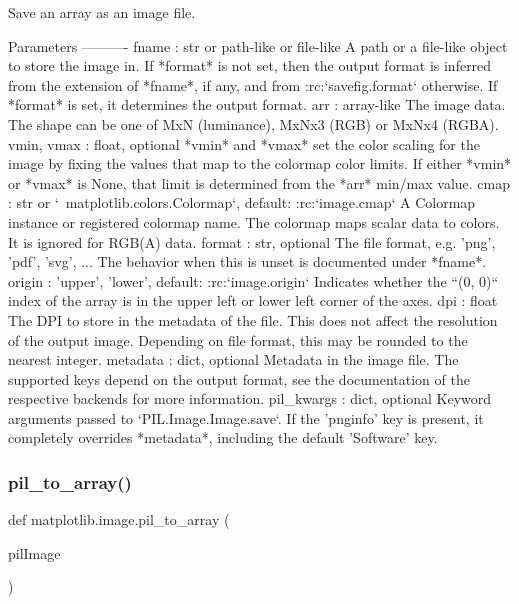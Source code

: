 \begin{DoxyVerb}Save an array as an image file.

Parameters
----------
fname : str or path-like or file-like
    A path or a file-like object to store the image in.
    If *format* is not set, then the output format is inferred from the
    extension of *fname*, if any, and from :rc:`savefig.format` otherwise.
    If *format* is set, it determines the output format.
arr : array-like
    The image data. The shape can be one of
    MxN (luminance), MxNx3 (RGB) or MxNx4 (RGBA).
vmin, vmax : float, optional
    *vmin* and *vmax* set the color scaling for the image by fixing the
    values that map to the colormap color limits. If either *vmin*
    or *vmax* is None, that limit is determined from the *arr*
    min/max value.
cmap : str or `~matplotlib.colors.Colormap`, default: :rc:`image.cmap`
    A Colormap instance or registered colormap name. The colormap
    maps scalar data to colors. It is ignored for RGB(A) data.
format : str, optional
    The file format, e.g. 'png', 'pdf', 'svg', ...  The behavior when this
    is unset is documented under *fname*.
origin : {'upper', 'lower'}, default: :rc:`image.origin`
    Indicates whether the ``(0, 0)`` index of the array is in the upper
    left or lower left corner of the axes.
dpi : float
    The DPI to store in the metadata of the file.  This does not affect the
    resolution of the output image.  Depending on file format, this may be
    rounded to the nearest integer.
metadata : dict, optional
    Metadata in the image file.  The supported keys depend on the output
    format, see the documentation of the respective backends for more
    information.
pil_kwargs : dict, optional
    Keyword arguments passed to `PIL.Image.Image.save`.  If the 'pnginfo'
    key is present, it completely overrides *metadata*, including the
    default 'Software' key.
\end{DoxyVerb}
 \mbox{\label{namespacematplotlib_1_1image_a989574f28f8a0552ce1d17bf89493c92}} 
\subsubsection{\texorpdfstring{pil\+\_\+to\+\_\+array()}{pil\_to\_array()}}
{\footnotesize\ttfamily def matplotlib.\+image.\+pil\+\_\+to\+\_\+array (\begin{DoxyParamCaption}\item[{}]{pil\+Image }\end{DoxyParamCaption})}

